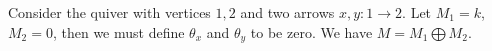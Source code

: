 Consider the quiver with vertices $1, 2$ and two arrows
$x, y\colon 1\to 2$. Let $M_1 = k$, $M_2 = 0$, then we must define
$\theta_x$ and $\theta_y$ to be zero. We have $M = M_1\bigoplus M_2$.
